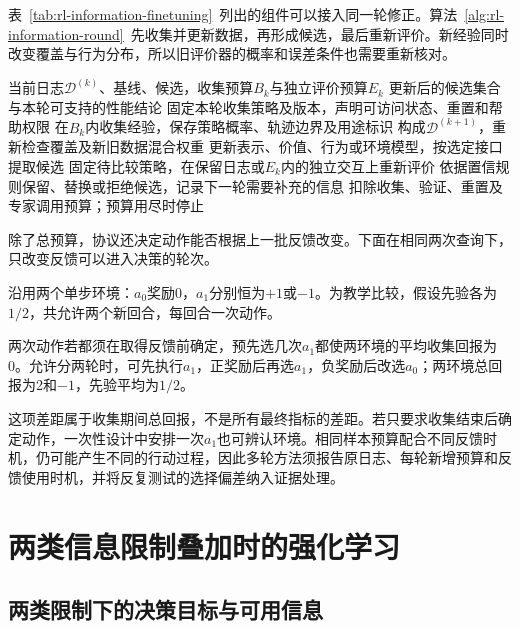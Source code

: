 表~\ref{tab:rl-information-finetuning}~列出的组件可以接入同一轮修正。算法~\ref{alg:rl-information-round}~先收集并更新数据，再形成候选，最后重新评价。新经验同时改变覆盖与行为分布，所以旧评价器的概率和误差条件也需要重新核对。

\begin{algorithm}[一轮有限经验修正]
  \label{alg:rl-information-round}
  \begin{algorithmic}[1]
    \Require 当前日志$\mathcal D^{(k)}$、基线、候选，收集预算$B_k$与独立评价预算$E_k$
    \Ensure 更新后的候选集合与本轮可支持的性能结论
    \State 固定本轮收集策略及版本，声明可访问状态、重置和帮助权限
    \State 在$B_k$内收集经验，保存策略概率、轨迹边界及用途标识
    \State 构成$\mathcal D^{(k+1)}$，重新检查覆盖及新旧数据混合权重
    \State 更新表示、价值、行为或环境模型，按选定接口提取候选
    \State 固定待比较策略，在保留日志或$E_k$内的独立交互上重新评价
    \State 依据置信规则保留、替换或拒绝候选，记录下一轮需要补充的信息
    \State 扣除收集、验证、重置及专家调用预算；预算用尽时停止
  \end{algorithmic}
\end{algorithm}

除了总预算，协议还决定动作能否根据上一批反馈改变。下面在相同两次查询下，只改变反馈可以进入决策的轮次。

\begin{example}[相同两次查询与不同适应轮次]
  \label{ex:rl-information-batches}
  沿用两个单步环境：$a_0$奖励0，$a_1$分别恒为$+1$或$-1$。为教学比较，假设先验各为$1/2$，共允许两个新回合，每回合一次动作。

  两次动作若都须在取得反馈前确定，预先选几次$a_1$都使两环境的平均收集回报为0。允许分两轮时，可先执行$a_1$，正奖励后再选$a_1$，负奖励后改选$a_0$；两环境总回报为2和$-1$，先验平均为$1/2$。
\end{example}

这项差距属于收集期间总回报，不是所有最终指标的差距。若只要求收集结束后确定动作，一次性设计中安排一次$a_1$也可辨认环境。相同样本预算配合不同反馈时机，仍可能产生不同的行动过程，因此多轮方法须报告原日志、每轮新增预算和反馈使用时机，并将反复测试的选择偏差纳入证据处理。

\section{两类信息限制叠加时的强化学习}
\label{sec:rl-information-combined}

\subsection{两类限制下的决策目标与可用信息}
\label{sec:rl-information-combined-target}

